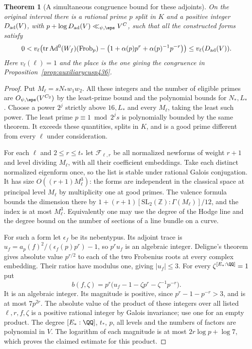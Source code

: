 \documentclass[a4paper,11pt]{article}
\newtheorem{theorem}[proposition]{Theorem}
\theoremstyle{definition}
\theoremstyle{remark}
\newcommand{\ZZ}{\mathbb Z}\newcommand{\ord}{\operatorname{ord}}
\numberwithin{equation}{section}
\begin{document}
\begin{theorem}[A simultaneous congruence bound for these adjoints]\leavevmode
\label{thm:actualseedcongruences436}
On the original interval there is a rational prime \(p\)
split in \(K\) and a positive integer \(D_{\rm ad}(V)\), with
\(p+\log D_{\rm ad}(V)\ll_{\psi,\eps}V^C\), such that all
the constructed forms satisfy
\[
 0<
 v_\ell\!\left(\operatorname{tr}\operatorname{Ad}^0(W_f)
    (\operatorname{Frob}_p)
    -\bigl(1+\alpha(p)p^r+\alpha(p)^{-1}p^{-r}\bigr)\right)
                  \le v_\ell(D_{\rm ad}(V)).
\]
Here \(v_\ell(\ell)=1\) and the place is the one giving the
congruence in Proposition~\ref{prop:auxiliarycusp436}.
\end{theorem}
\begin{proof}
Put \(M_\ell=sN_*w_1w_2\). All these integers and the number
of eligible primes are \(O_{\psi,\eps}(V^{C_2})\) by the
least-prime bound and the polynomial bounds for \(N_*,L_*\).
Choose a power \(2^j\) strictly above \(16,L_*\) and every
\(M_\ell\), taking the least such power. The least prime
\(p\equiv1\bmod 2^j s\) is polynomially bounded by the
same theorem. It exceeds these quantities, splits in \(K\),
and is a good prime different from every \(\ell\) under
consideration.

For each \(\ell\) and \(2\le r\le t_*\) let \(\mathcal F_{\ell,r}\)
be all normalized newforms of weight \(r+1\) and level
dividing \(M_\ell\), with all their coefficient embeddings.
Take each distinct normalized eigenform once, so the list
is stable under rational Galois conjugation. It has size
\(O((r+1)M_\ell^3)\): the forms are independent in the
classical space at principal level \(M_\ell\) by multiplicity
one at good primes. The valence formula bounds the dimension
there by \(1+(r+1)[\mathrm{SL}_2(\ZZ):\Gamma(M_\ell)]/12\),
and the index is at most \(M_\ell^3\). Equivalently one
may use the degree of the Hodge line and the degree bound
on the number of sections of a line bundle on a curve.

For such a form let \(\epsilon_f\) be its nebentypus.
Its adjoint trace is
\(u_f=a_p(f)^2/(\epsilon_f(p)p^r)-1\), so \(p^r u_f\)
is an algebraic integer. Deligne's theorem gives absolute
value \(p^{r/2}\) to each of the two Frobenius roots at
every complex embedding. Their ratios have modulus one,
giving \(|u_f|\le3\). For every \(\zeta^{[E_*:\QQ]}=1\) put
\[
       b(f,\zeta)=p^r\bigl(u_f-1-\zeta p^r-\zeta^{-1}p^{-r}\bigr).
\]
It is an algebraic integer. Its magnitude is positive,
since \(p^r-1-p^{-r}>3\), and is at most \(7p^{2r}\).
The absolute value of the product of these integers over
all listed \(\ell,r,f,\zeta\) is a positive rational integer
by Galois invariance; use one for an empty product.
The degree \([E_*:\QQ]\), \(t_*\), \(p\), all levels and
the numbers of factors are polynomial in \(V\). The
logarithm of each magnitude is at most \(2r\log p+\log 7\),
which proves the claimed estimate for this product.


\end{proof}
\end{document}
